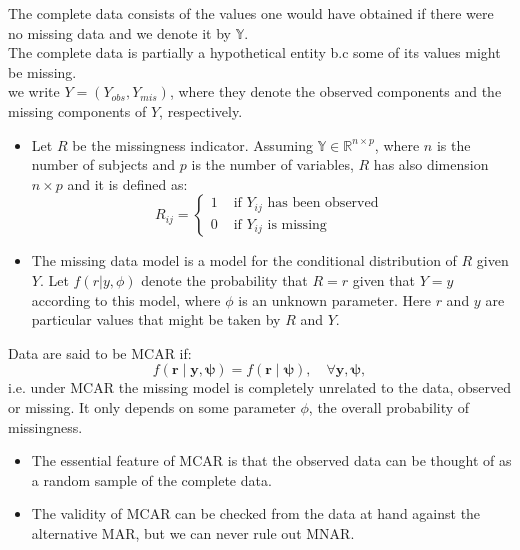 \documentclass[11pt]{article}
\theoremstyle{break}
\begin{document}
\begin{definition}
    The complete data consists of the values one would have obtained if there
    were no missing data and we denote it by $\mathbb{Y}$.
\\ The complete data is partially a hypothetical entity b.c some of its values
might be missing.
\\ we write $Y = (Y_{obs}, Y_{mis})$,
    where they denote the observed components and the missing components of
    $Y$, respectively.
\begin{itemize}
    \item Let $R$ be the missingness indicator. Assuming $\mathbb{Y}
        \in \mathbb{R}^{n\times p}$, where $n$ is the number of subjects and
        $p$ is the number of variables, $R$ has also dimension $n \times p$
        and it is defined as:
\begin{equation}
R_{i j}= \begin{cases}1 & \text { if } Y_{i j} \text { has been observed } \\ 0 & \text { if } Y_{i j} \text { is missing }\end{cases}
\end{equation}
    \item The missing data model is a model for the conditional
        distribution of $R$ given $Y$. Let $f(r|y,\phi)$ denote the probability
        that $R = r$ given that $Y=y$ according to this model, where $\phi$ is
        an unknown parameter. Here $r$ and $y$ are particular values that
        might be taken by $R$ and $Y$.
\end{itemize}

\end{definition}



\begin{definition}[MCAR]
    Data are said to be MCAR if:
    \begin{equation}
f(\mathbf{r} \mid \mathbf{y}, \boldsymbol{\psi})=f(\mathbf{r} \mid
\boldsymbol{\psi}), \quad \forall \mathbf{y}, \boldsymbol{\psi},
\end{equation}
i.e. under MCAR the missing model is completely unrelated to the data, observed
or missing. It only depends on some parameter $\phi$, the overall probability of
missingness.
\begin{itemize}
    \item The essential feature of MCAR is that the observed data can be
        thought of as a random sample of the complete data.
    \item The validity of MCAR can be checked from the data at hand against
        the alternative MAR, but we can never rule out MNAR.
    \end{itemize}
\end{definition}
\end{document}
